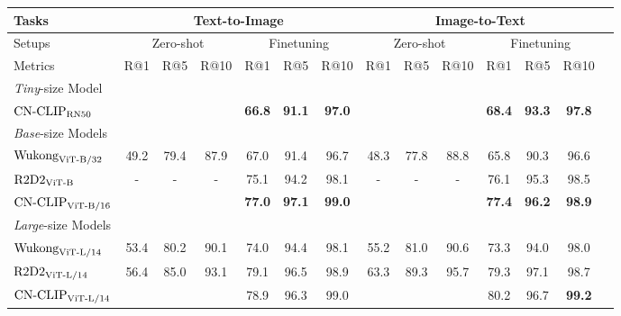 \documentclass[11pt]{article}
\begin{document}
\begin{table*}[t]
\center
\small
\vskip 0.15in
\begin{adjustbox}{max width=1.\textwidth}
\begin{tabular}{@{\extracolsep{\fill}}lccccccccccccc}
\toprule
  Tasks
  &\multicolumn{6}{c}{Text-to-Image}
  &\multicolumn{6}{c}{Image-to-Text}
  \\
\midrule
  Setups
  &\multicolumn{3}{c}{Zero-shot}
  &\multicolumn{3}{c}{Finetuning}
  &\multicolumn{3}{c}{Zero-shot}
  &\multicolumn{3}{c}{Finetuning}
  \\
\midrule
  Metrics & R@1 & R@5 & R@10 & R@1 & R@5 & R@10 & R@1 & R@5 & R@10 & R@1 & R@5 & R@10 
  \\
\midrule
    \multicolumn{13}{l}{\textit{Tiny}-size Model} \\
    $\text{CN-CLIP}\rm_{RN50}$
    & \color{gray}{48.1}	& \color{gray}{81.3}	& \color{gray}{90.5}	& \textbf{66.8}	& \textbf{91.1}	& \textbf{97.0}	& \color{gray}{51.6}	& \color{gray}{81.2}	& \color{gray}{90.5}	& \textbf{68.4}	& \textbf{93.3}	& \textbf{97.8}
    \\
\midrule
    \multicolumn{13}{l}{\textit{Base}-size Models} \\
    $\text{Wukong}\rm_{ViT\text{-}B/32}$
    & 49.2	& 79.4	& 87.9	& 67.0	& 91.4	& 96.7	& 48.3	& 77.8	& 88.8	& 65.8	& 90.3	& 96.6
    \\
    $\text{R2D2}\rm_{ViT\text{-}B}$
    & -	& -	& -	& 75.1	& 94.2	& 98.1	& -	& -	& -	& 76.1	& 95.3	& 98.5
    \\
    $\text{CN-CLIP}\rm_{ViT\text{-}B/16}$
    & \color{gray}{62.2}	& \color{gray}{86.6}	& \color{gray}{94.9}	& \textbf{77.0}	& \textbf{97.1}	& \textbf{99.0}	& \color{gray}{57.0}	& \color{gray}{84.1}	& \color{gray}{93.6}	& \textbf{77.4}	& \textbf{96.2}	& \textbf{98.9}
    \\
\midrule
    \multicolumn{9}{l}{\textit{Large}-size Models} \\
    $\text{Wukong}\rm_{ViT\text{-}L/14}$
    & 53.4	& 80.2	& 90.1	& 74.0	& 94.4	& 98.1	& 55.2	& 81.0	& 90.6	& 73.3	& 94.0	& 98.0
    \\
    $\text{R2D2}\rm_{ViT\text{-}L/14}$
    & 56.4	& 85.0	& 93.1	& 79.1	& 96.5	& 98.9	& 63.3	& 89.3	& 95.7	& 79.3	& 97.1	& 98.7
    \\
    $\text{CN-CLIP}\rm_{ViT\text{-}L/14}$
     & \color{gray}{64.0}	  & \color{gray}{89.2}	 & \color{gray}{94.4}	 & 78.9	 & 96.3	 & 99.0	 & \color{gray}{60.4}	 & \color{gray}{84.2}	 & \color{gray}{92.9}	 & 80.2	 & 96.7	 & \textbf{99.2}
    \\

\end{tabular}
\end{adjustbox}
\end{table*}
\end{document}
